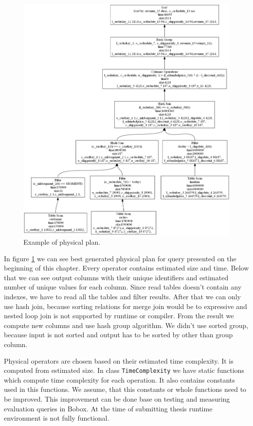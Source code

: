 \begin{figure}[h!]
  \centering
    \includegraphics[width=1.0\textwidth]{physicalplan}

      \caption{Example of physical plan.}
          \label{fig:physicalplan}
\end{figure}


In figure \ref{fig:physicalplan} we can see best generated physical plan for query presented on the beginning of this chapter. Every operator contains estimated size and time. Below that we can see output columns with their unique identifiers and estimated number of unique values for each column. Since read tables doesn't contain any indexes, we have to read all the tables and filter results. After that we can only use hash join, because sorting relations for merge join would be to expressive and nested loop join is not supported by runtime or compiler. From the result we compute new columns and use hash group algorithm. We didn't use sorted group, because input is not sorted and output has to be sorted by other than group column.

Physical operators are chosen based on their estimated time complexity. It is computed from estimated size. In class \texttt{TimeComplexity} we have static functions which compute time complexity for each operation. It also contains constants used in this functions. We assume, that this constants or whole functions need to be improved. This improvement can be done base on testing and measuring evaluation queries in Bobox. At the time of submitting thesis runtime environment is not fully functional.





